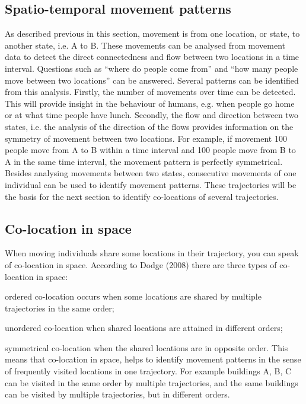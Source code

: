 \subsection{Spatio-temporal movement patterns}
As described previous in this section, movement is from one location, or state, to another state, i.e. A to B. These movements can be analysed from movement data to detect the direct connectedness and flow between two locations in a time interval. Questions such as “where do people come from” and “how many people move between two locations” can be answered. Several patterns can be identified from this analysis. Firstly, the number of movements over time can be detected. This will provide insight in the behaviour of humans, e.g. when people go home or at what time people have lunch. Secondly, the flow and direction between two states, i.e. the analysis of the direction of the flows provides information on the symmetry of movement between two locations. For example, if movement 100 people move from A to B within a time interval and 100 people move from B to A in the same time interval, the movement pattern is perfectly symmetrical.
Besides analysing movements between two states, consecutive movements of one individual can be used to identify movement patterns. These trajectories will be the basis for the next section to identify co-locations of several trajectories. 	

\subsection{Co-location in space}
When moving individuals share some locations in their trajectory, you can speak of co-location in space. According to Dodge (2008) there are three types of co-location in space: \begin {enumerate*} [label=\itshape\arabic*\upshape),font={\color{red!0!black}\bfseries}] \item ordered co-location occurs when some locations are shared by multiple trajectories in the same order; \item unordered co-location when shared locations are attained in different orders; \item symmetrical co-location when the shared locations are in opposite order. This means that co-location in space, helps to identify movement patterns in the sense of frequently visited  locations in one trajectory. For example buildings A, B, C can be visited in the same order by multiple trajectories, and the same buildings can be visited by multiple trajectories, but in different orders. 
\end{enumerate*}

